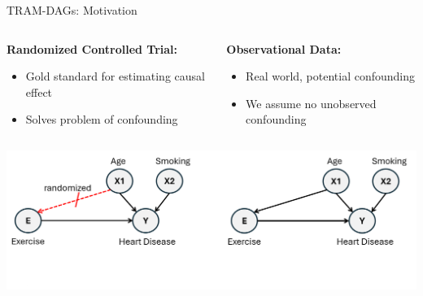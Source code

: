 \documentclass[onlytextwidth,english]{beamer}\usepackage[]{graphicx}\usepackage[]{xcolor}
\begin{document}
\begin{frame}{TRAM-DAGs: Motivation}

\vspace{1cm}

\begin{columns}

\begin{column}{0.43\textwidth}
\textbf{Randomized Controlled Trial:}
\begin{itemize}
    \item Gold standard for estimating causal effect
    \item Solves problem of confounding
\end{itemize}

\end{column}


\begin{column}{0.45\textwidth}
\textbf{Observational Data:}
\begin{itemize}
    \item Real world, potential confounding
    \item We assume no unobserved confounding
\end{itemize}
\end{column}

\end{columns}


\includegraphics[width=\textwidth]{img/RCT_Observational.png}


\end{frame}
\end{document}
